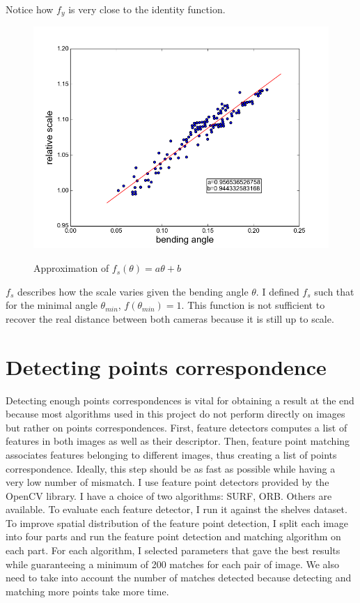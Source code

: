 \documentclass[11pt]{report}
\begin{document}
Notice how $f_y$ is very close to the identity function.

\begin{figure}[H]
    \begin{center}
        \includegraphics[scale=0.5]{images/newmodel_scale.png}
        \label{fig:newmodelS}
        \caption{Approximation of $f_s(\theta) = a\theta+b$}
    \end{center}
\end{figure}
$f_s$ describes how the scale varies given the bending angle $\theta$. I defined $f_s$ such that for the minimal angle $\theta_{min}$, $f(\theta_{min}) = 1$. This function is not sufficient to recover the real distance between both cameras because it is still up to scale.
\section{Detecting points correspondence}

Detecting enough points correspondences is vital for obtaining a result at the end because most algorithms used in this project do not perform directly on images but rather on points correspondences. First, feature detectors computes a list of features in both images as well as their descriptor. Then, feature point matching associates features belonging to different images, thus creating a list of points correspondence. Ideally, this step should be as fast as possible while having a very low number of mismatch.
I use feature point detectors provided by the OpenCV library. I have a choice of two algorithms: SURF, ORB. Others are available. To evaluate each feature detector, I run it against the shelves dataset. To improve spatial distribution of the feature point detection, I split each image into four parts and run the feature point detection and matching algorithm on each part. For each algorithm, I selected parameters that gave the best results while guaranteeing a minimum of 200 matches for each pair of image. We also need to take into account the number of matches detected because detecting and matching more points take more time.
\end{document}
